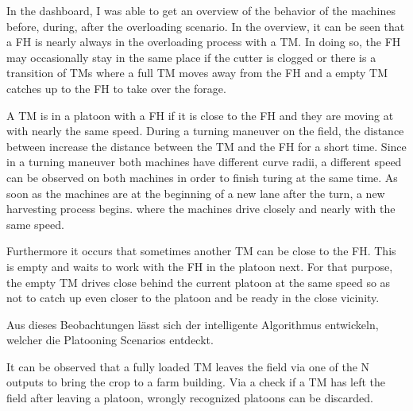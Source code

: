 \documentclass[]{nsm-thesis}
\begin{document}
In the dashboard, I was able to get an overview of the behavior of the machines before, during, after the overloading scenario.
In the overview, it can be seen that a \ac{FH} is nearly always in the overloading process with a \ac{TM}. In doing so, the FH may occasionally stay in the same place if the cutter is clogged or there is a transition of \ac{TM}s where a full \ac{TM} moves away from the \ac{FH} and a empty \ac{TM} catches up to the \ac{FH} to take over the forage.

A \ac{TM} is in a platoon with a \ac{FH} if it is close to the \ac{FH} and they are moving at
with nearly the same speed. During a turning maneuver on the field, the distance between
increase the distance between the \ac{TM} and the \ac{FH} for a short time. Since in a turning maneuver both machines have different curve radii, a different speed can be observed on both machines in order to finish turing at the same time.
As soon as the machines are at the beginning of a new lane after the turn, a new harvesting process begins.
where the machines drive closely and nearly with the same speed. 

Furthermore it occurs that sometimes another TM can be close to the \ac{FH}. This is empty and waits to work with the FH in the platoon next. For that purpose, the empty TM drives close behind the current platoon at the same speed so as not to catch up even closer to the platoon and be ready in the close vicinity.

Aus dieses Beobachtungen lässt sich der intelligente Algorithmus entwickeln, welcher die Platooning Scenarios entdeckt. 

It can be observed  that a fully loaded TM leaves the field via one of the N outputs to bring the crop to a farm building. Via a
check if a TM has left the field after leaving a platoon,
wrongly recognized platoons can be discarded.
\end{document}
